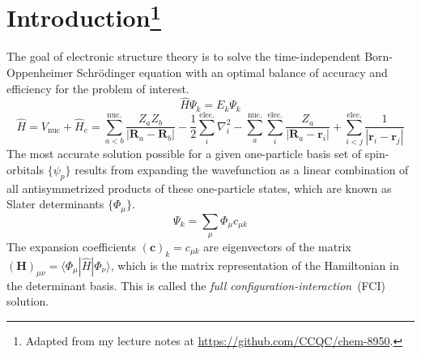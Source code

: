 \chapter[%
    Introduction
]{%
    Introduction\footnote{%
        Adapted from my lecture notes at
        \url{https://github.com/CCQC/chem-8950}.
    }
}

The goal of electronic structure theory is to solve the time-independent
Born-Oppenheimer Schr\"odinger equation with an optimal balance of accuracy and
efficiency for the problem of interest.
\begin{equation}
    \label{eq:electronic-schrodinger-equation}
    \hat{H}\Psi_k
    =
    E_k\Psi_k
\end{equation}
\begin{equation}
    \hat{H}
    =
    V_{\mathrm{nuc}}
    +
    \hat{H}_e
    =
    \sum_{a<b}^{\text{nuc.}}
    \frac{Z_aZ_b}{|\mathbf{R}_a-\mathbf{R}_b|}
    -
    \frac{1}{2}
    \sum_i^{\text{elec.}}
    \nabla_i^2
    -
    \sum_a^{\text{nuc.}}
    \sum_i^{\text{elec.}}
    \frac{Z_a}{|\mathbf{R}_a-\mathbf{r}_i|}
    +
    \sum_{i<j}^{\text{elec.}}
    \frac{1}{|\mathbf{r}_i-\mathbf{r}_j|}
\end{equation}
The most accurate solution possible for a given one-particle basis set of
spin-orbitals
\(
    \{\psi_p\}
\)
results from expanding the wavefunction as a linear combination of all
antisymmetrized products of these one-particle states, which are known as Slater
determinants
\(
    \{\Phi_\mu\}
\).
\begin{equation}
    \label{eq:full-ci-wavefunction-expansion}
    \Psi_k
    =
    \sum_\mu
    \Phi_\mu
    c_{\mu k}
\end{equation}
The expansion coefficients \((\mathbf{c})_k=c_{\mu k}\) are eigenvectors of the
matrix \((\mathbf{H})_{\mu\nu}=\langle\Phi_\mu|\hat{H}|\Phi_\nu\rangle\), which
is the matrix representation of the Hamiltonian in the determinant basis.
This is called the {\itshape full configuration-interaction}\ (FCI) solution.


